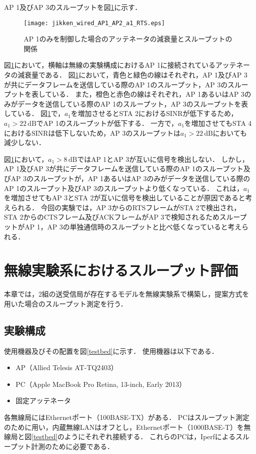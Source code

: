 \documentclass[master]{kuisthesis}		%
\begin{document}
AP 1及びAP 3のスループットを図\ref{throughput_a1_RTS}に示す．
\ifnum {}
\begin{figure}[!t]
\centering
\texttt{[image: jikken\_wired\_AP1\_AP2\_a1\_RTS.eps]}
\caption{AP 1のみを制御した場合のアッテネータの減衰量とスループットの関係}
\label{throughput_a1_RTS}
\end{figure}
\fi
図\ref{throughput_a1_RTS}において，横軸は無線の実験構成におけるAP 1に接続されているアッテネータの減衰量である．
図\ref{throughput_a1_RTS}において，青色と緑色の線はそれぞれ，AP 1及びAP 3が共にデータフレームを送信している際のAP 1のスループット，AP 3のスループットを表している．
また，橙色と赤色の線はそれぞれ，AP 1あるいはAP 3のみがデータを送信している際のAP 1のスループット，AP 3のスループットを表している．
図\ref{throughput_a1_RTS}で，$a_1$を増加させるとSTA 2におけるSINRが低下するため，$a_1 > 22\,\mathrm{dB}$でAP 1のスループットが低下する．
一方で，$a_1$を増加させてもSTA 4におけるSINRは低下しないため，AP 3のスループットは$a_1 > 22\,\mathrm{dB}$においても減少しない．

図\ref{throughput_a1_RTS}において，$a_1>8\,\mathrm{dB}$ではAP 1とAP 3が互いに信号を検出しない．
しかし，AP 1及びAP 3が共にデータフレームを送信している際のAP 1のスループット及びAP 3のスループットが，AP 1あるいはAP 3のみがデータを送信している際のAP 1のスループット及びAP 3のスループットより低くなっている．
これは，$a_1$を増加させてもAP 3とSTA 2が互いに信号を検出していることが原因であると考えられる．
今回の実験では，AP 3からのRTSフレームがSTA 2で検出され，STA 2からのCTSフレーム及びACKフレームがAP 3で検知されるためスループットがAP 1，AP 3の単独通信時のスループットと比べ低くなっていると考えられる．


\section{無線実験系におけるスループット評価} \label{無線実験}
本章では，2組の送受信局が存在するモデルを無線実験系で構築し，提案方式を用いた場合のスループット測定を行う．
\subsection{実験構成}
使用機器及びその配置を図\ref{testbed}に示す．
使用機器は以下である．
\begin{itemize}
\item AP（Allied Telesis AT-TQ2403）
\item PC（Apple MacBook Pro Retina, 13-inch, Early 2013）
\item 固定アッテネータ
\end{itemize}
各無線局にはEthernetポート（100BASE-TX）がある．
PCはスループット測定のために用い，内蔵無線LANはオフとし，Ethernetポート（1000BASE-T）を無線局と図\ref{testbed}のようにそれぞれ接続する．
これらのPCは，Iperfによるスループット計測のために必要である．
\end{document}
